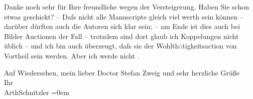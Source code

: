 \pstart
           Danke noch sehr für Ihre freundliche \label{K_L03762-2v}\label{K_L03762-2} wegen der
               Versteigerung. Haben Sie schon etwas geschickt? – Daſs nicht alle Manuscripte gleich
               viel werth sein können – darüber dürften auch die Autoren sich klar sein; – {\pb}am Ende ist dies auch bei Bilder Auctionen der Fall –
               trotzdem sind dort glaub ich Koppelungen nicht üblich – und ich bin auch überzeugt,
               daſs sie der Wohlth\textcolor{gray}{ä}tigkeitsaction von Vortheil sein werden. Aber
               ich werde nicht \label{K_L03762-3v}\label{K_L03762-3}.\pend
           
\pstart
           Auf Wiedersehen, mein lieber Doctor Stefan Zweig und sehr herzliche Grüße{\\[\baselineskip]}Ihr{\\[\baselineskip]}\spacefill\mbox{ArthSchnitzler}\pend
           \leftskip=0em{}\endnumbering{}  \newcommand{\dateiname}{L03762}\newcommand{\titel}{Arthur Schnitzler an Stefan Zweig, 3[1?]. 7. 1929}\newcommand{\editorInnen}{Selma Jahnke und Martin Anton Müller}
